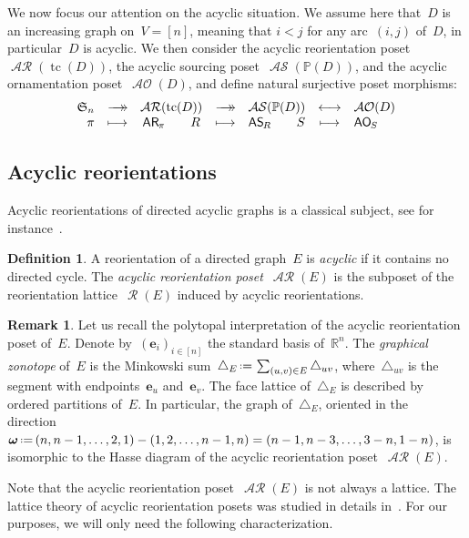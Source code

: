 \documentclass{amsart}
\theoremstyle{definition}
\newtheorem{definition}[theorem]{Definition}
\newtheorem{remark}[theorem]{Remark}
\newcommand{\R}{\mathbb{R}} %
\renewcommand{\b}[1]{\boldsymbol{#1}} %
\renewcommand{\c}[1]{\mathcal{#1}} %
\newcommand{\eqdef}{\mbox{\,\raisebox{0.2ex}{\scriptsize\ensuremath{\mathrm:}}\ensuremath{=}\,}} %
\newcommand{\simplex}{\triangle} %
\newcommand{\surjection}{\longrightarrow\mathrel{\mkern-22mu}\rightarrow\,}
\newcommand{\bijection}{\longleftrightarrow}
\DeclareMathOperator{\tc}{tc} %
\newcommand{\darkblue}{\color{darkblue}} %
\newcommand{\defn}[1]{\textsl{\darkblue #1}} %
\newcommand{\fS}{\mathfrak{S}} %
\newcommand{\mymap}[2]{\mathsf{#1}_{\hspace{-.7pt}#2}}
\DeclareMathOperator{\AOrn}{\c{AO}}  %
\newcommand{\aorn}[1]{\mymap{AO}{#1}}  %
\DeclareMathOperator{\Reori}{\c{R}}  %
\DeclareMathOperator{\AReori}{\c{AR}}  %
\newcommand{\areori}[1]{\mymap{AR}{#1}}  %
\DeclareMathOperator{\ASour}{\mathcal{AS}}  %
\newcommand{\asour}[1]{\mymap{AS}{#1}}  %
\newcommand{\PP}{\mathbb P} %
\begin{document}
We now focus our attention on the acyclic situation.
We assume here that~$D$ is an increasing graph on~$V = [n]$, meaning that $i < j$ for any arc~$(i,j)$ of~$D$, in particular~$D$ is acyclic.
We then consider the acyclic reorientation poset~$\AReori(\tc(D))$, the acyclic sourcing poset~$\ASour(\PP(D))$, and the acyclic ornamentation poset~$\AOrn(D)$, and define natural surjective poset morphisms:
\[
\begin{array}{rcccccl}
	\fS_n & \surjection & \AReori(\tc(D)) & \surjection & \ASour(\PP(D)) & \bijection & \AOrn(D) \\
	\pi & \longmapsto & \areori{\pi} \qquad R & \longmapsto & \asour{R} \qquad S & \longmapsto & \aorn{S}
\end{array}
\]

\subsection{Acyclic reorientations}

Acyclic reorientations of directed acyclic graphs is a classical subject, see for instance~\cite{Pilaud-acyclicReorientationLattices}.

\begin{definition}
\label{def:AReori}
A reorientation of a directed graph~$E$ is \defn{acyclic} if it contains no directed cycle.
The \defn{acyclic reorientation poset}~$\AReori(E)$ is the subposet of the reorientation lattice~$\Reori(E)$ induced by acyclic reorientations.
\end{definition}

\begin{remark}
Let us recall the polytopal interpretation of the acyclic reorientation poset of~$E$.
Denote by~$(\b{e}_i)_{i \in [n]}$ the standard basis of~$\R^n$.
The \defn{graphical zonotope} of~$E$ is the Minkowski sum~$\simplex_E \eqdef \sum_{(u,v) \in E} \simplex_{uv}$, where~$\simplex_{uv}$ is the segment with endpoints~$\b{e}_u$ and~$\b{e}_v$.
The face lattice of~$\simplex_E$ is described by ordered partitions of~$E$.
In particular, the graph of~$\simplex_E$, oriented in the direction~$\b{\omega} \eqdef (n, n-1, \dots, 2, 1) - (1, 2, \dots, n-1, n) = (n-1, n-3, \dots, 3-n, 1-n)$, is isomorphic to the Hasse diagram of the acyclic reorientation poset~$\AReori(E)$.
\end{remark}

Note that the acyclic reorientation poset~$\AReori(E)$ is not always a lattice.
The lattice theory of acyclic reorientation posets was studied in details in~\cite{Pilaud-acyclicReorientationLattices}.
For our purposes, we will only need the following characterization.
\end{document}
